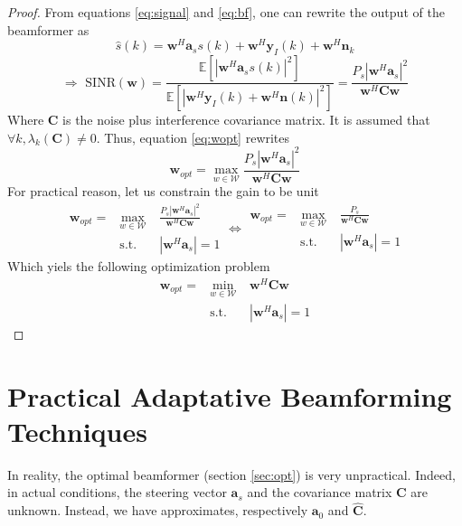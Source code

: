 \documentclass[12pt]{article}
\begin{document}
\begin{proof}
From equations \ref{eq:signal} and \ref{eq:bf}, one can rewrite the output of the beamformer as
\begin{equation*}\label{eq:new_signal}
   \hat{s}(k) = \mathbf{w}^H\mathbf{a}_ss(k) + \mathbf{w}^H\mathbf{y}_{I}(k) + \mathbf{w}^H\mathbf{n}_k
\end{equation*}
\begin{equation*}
    \Rightarrow \text{ SINR}(\mathbf{w}) = \frac{\mathbb{E}\left[|\mathbf{w}^H\mathbf{a}_ss(k)|^2\right]}{\mathbb{E}\left[|\mathbf{w}^H\mathbf{y}_{I}(k) + \mathbf{w}^H\mathbf{n}(k)|^2\right]} = \frac{P_s|\mathbf{w}^H\mathbf{a}_s|^2}{\mathbf{w}^H\mathbf{C}\mathbf{w}}
\end{equation*}
Where $\mathbf{C}$ is the noise plus interference covariance matrix.
It is assumed that $\forall k, \lambda_k(\mathbf{C})\neq 0$. Thus, equation \ref{eq:wopt} rewrites
\begin{equation*}
    \mathbf{w}_{opt} = \max_{w\in\mathcal{W}} \frac{P_s|\mathbf{w}^H\mathbf{a}_s|^2}{\mathbf{w}^H\mathbf{C}\mathbf{w}}
\end{equation*}
For practical reason, let us constrain the gain to be unit
$$\begin{aligned}
    \mathbf{w}_{opt} =& \max_{w\in\mathcal{W}} &\frac{P_s|\mathbf{w}^H\mathbf{a}_s|^2}{\mathbf{w}^H\mathbf{C}\mathbf{w}}\\
    & \textrm{s.t.} \quad &|\mathbf{w}^H\mathbf{a}_s| = 1
\end{aligned} \Longleftrightarrow \begin{aligned}
    \mathbf{w}_{opt} =& \max_{w\in\mathcal{W}} &\frac{P_s}{\mathbf{w}^H\mathbf{C}\mathbf{w}}\\
    & \textrm{s.t.} \quad &|\mathbf{w}^H\mathbf{a}_s| = 1
\end{aligned}$$
Which yiels the following optimization problem
$$\begin{aligned}
    \mathbf{w}_{opt} =& \min_{w\in\mathcal{W}} &\mathbf{w}^H\mathbf{C}\mathbf{w}\\
    & \textrm{s.t.} \quad &|\mathbf{w}^H\mathbf{a}_s| = 1
\end{aligned}$$
\end{proof}
\section{Practical Adaptative Beamforming Techniques}
In reality, the optimal beamformer (section \ref{sec:opt}) is very unpractical. Indeed, in actual conditions, the steering vector $\mathbf{a}_s$ and the covariance matrix $\mathbf{C}$ are unknown. Instead, we have approximates, respectively $\mathbf{a}_0$ and $\hat{\mathbf{C}}$.
\end{document}

